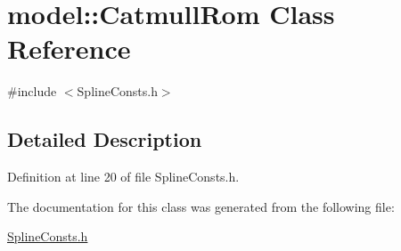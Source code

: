 \hypertarget{classmodel_1_1_catmull_rom}{}\section{model\+:\+:Catmull\+Rom Class Reference}
\label{classmodel_1_1_catmull_rom}


{\ttfamily \#include $<$Spline\+Consts.\+h$>$}



\subsection{Detailed Description}


Definition at line 20 of file Spline\+Consts.\+h.



The documentation for this class was generated from the following file\+:\begin{DoxyCompactItemize}
\item 
\hyperlink{_spline_consts_8h}{Spline\+Consts.\+h}\end{DoxyCompactItemize}
